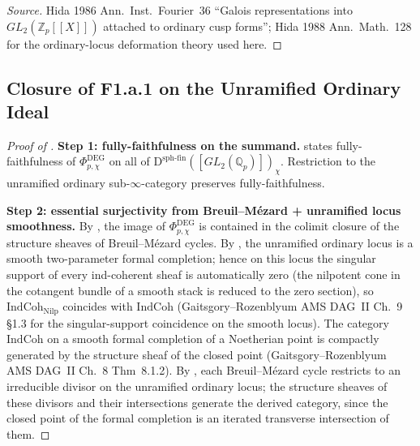 \begin{proof}[Source]
Hida 1986 Ann.~Inst.~Fourier~36 ``Galois representations into
\(GL_{2}(\mathbb{Z}_{p}[[X]])\) attached to ordinary cusp forms''; Hida
1988 Ann.~Math.~128 for the ordinary-locus deformation theory used
here.
\end{proof}

\subsection{Closure of F1.a.1 on the Unramified Ordinary Ideal}

\begin{proof}[Proof of ]
\textbf{Step 1: fully-faithfulness on the summand.}
 states fully-faithfulness of
\(\Phi^{\mathrm{DEG}}_{p,\chi}\) on all of
\(\mathrm{D}^{\mathrm{sph\text{-}fin}}([GL_{2}(\mathbb{Q}_{p})])_{\chi}\).
Restriction to the unramified ordinary sub-\(\infty\)-category
preserves fully-faithfulness.

\textbf{Step 2: essential surjectivity from Breuil--M{\'e}zard +
unramified locus smoothness.} By
, the image of
\(\Phi^{\mathrm{DEG}}_{p,\chi}\) is contained in the colimit closure
of the structure sheaves of Breuil--M{\'e}zard cycles. By
, the unramified ordinary locus
is a smooth two-parameter formal completion; hence on this locus
the singular support of every ind-coherent sheaf is automatically
zero (the nilpotent cone in the cotangent bundle of a smooth stack
is reduced to the zero section), so
\(\mathrm{IndCoh}_{\mathrm{Nilp}}\) coincides with
\(\mathrm{IndCoh}\) (Gaitsgory--Rozenblyum AMS DAG~II Ch.~9 \S 1.3 for
the singular-support coincidence on the smooth locus). The
category \(\mathrm{IndCoh}\) on a smooth formal completion of a
Noetherian point is compactly generated by the structure sheaf of
the closed point (Gaitsgory--Rozenblyum AMS DAG~II Ch.~8
Thm~8.1.2). By , each
Breuil--M{\'e}zard cycle restricts to an irreducible divisor on the
unramified ordinary locus; the structure sheaves of these divisors
and their intersections generate the derived category, since the
closed point of the formal completion is an iterated transverse
intersection of them.


\end{proof}
